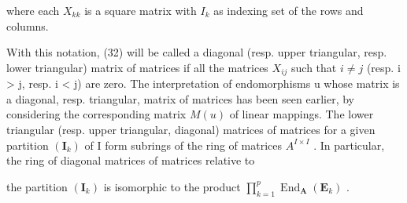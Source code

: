 where each \(X_{kk}\) is a square matrix with \(I_{k}\) as indexing set of the rows and columns.

With this notation, (32) will be called a diagonal (resp. upper triangular, resp. lower triangular) matrix of matrices if all the matrices \(X_{ij}\) such that \(i \neq j\) (resp. i \textgreater{} j, resp. i \textless{} j) are zero. The interpretation of endomorphisms u whose matrix is a diagonal, resp. triangular, matrix of matrices has been seen earlier, by considering the corresponding matrix \(M(u)\) of linear mappings. The lower triangular (resp. upper triangular, diagonal) matrices of matrices for a given partition \((\mathbf{I}_{k})\) of I form subrings of the ring of matrices \(A^{I \times I}\) . In particular, the ring of diagonal matrices of matrices relative to

the partition \((\mathbf{I}_k)\) is isomorphic to the product \(\prod_{k=1}^{p} \operatorname{End}_{\mathbf{A}}(\mathbf{E}_k)\) .
\relax{}
